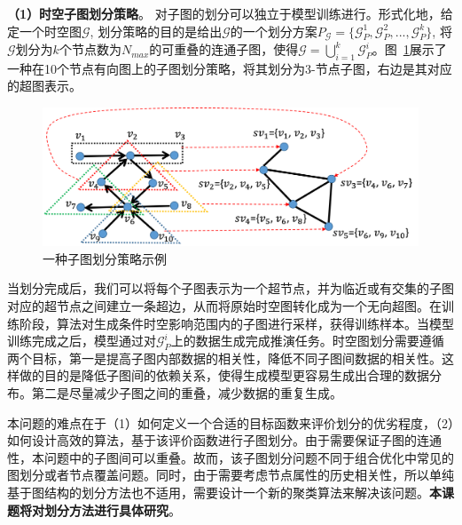 \documentclass[12pt,UTF8,AutoFakeBold=2,a4paper]{ctexart} %
\begin{document}
\textbf{（1）时空子图划分策略}。
对子图的划分可以独立于模型训练进行。形式化地，给定一个时空图$\mathcal{G}$, %
划分策略的目的是给出$\mathcal{G}$的一个划分方案$P_{\mathcal{G}}=\{\mathcal{G}^1_P, \mathcal{G}^2_P, ..., \mathcal{G}^k_P\}$, 将$\mathcal{G}$划分为$k$个节点数为$N_{max}$的可重叠的连通子图，使得$\mathcal{G} = \bigcup_{i=1}^k\mathcal{G}^i_P$。图~\ref{fig:part_1}展示了一种在10个节点有向图上的子图划分策略，将其划分为3-节点子图，右边是其对应的超图表示。
\begin{figure}
    \centering
    \includegraphics[width=0.8\linewidth]{fig/paritition-1_new.png}
    \caption{一种子图划分策略示例}
    \label{fig:part_1}
\end{figure}
当划分完成后，我们可以将每个子图表示为一个超节点，并为临近或有交集的子图对应的超节点之间建立一条超边，从而将原始时空图转化成为一个无向超图。在训练阶段，算法对生成条件时空影响范围内的子图进行采样，获得训练样本。当模型训练完成之后，模型通过对$\mathcal{G}^i_P$上的数据生成完成推演任务。时空图划分需要遵循两个目标，第一是提高子图内部数据的相关性，降低不同子图间数据的相关性。这样做的目的是降低子图间的依赖关系，使得生成模型更容易生成出合理的数据分布。第二是尽量减少子图之间的重叠，减少数据的重复生成。

本问题的难点在于（1）如何定义一个合适的目标函数来评价划分的优劣程度，（2）如何设计高效的算法，基于该评价函数进行子图划分。由于需要保证子图的连通性，本问题中的子图间可以重叠。故而，该子图划分问题不同于组合优化中常见的图划分或者节点覆盖问题。同时，由于需要考虑节点属性的历史相关性，所以单纯基于图结构的划分方法也不适用，需要设计一个新的聚类算法来解决该问题。\textbf{本课题将对划分方法进行具体研究}。
\end{document}
